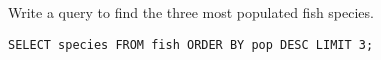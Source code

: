 \begin{blocksection}
\question Write a query to find the three most populated fish species.

\begin{solution}[0.7in]
\begin{lstlisting}
SELECT species FROM fish ORDER BY pop DESC LIMIT 3;
\end{lstlisting}
\end{solution}
\end{blocksection}
